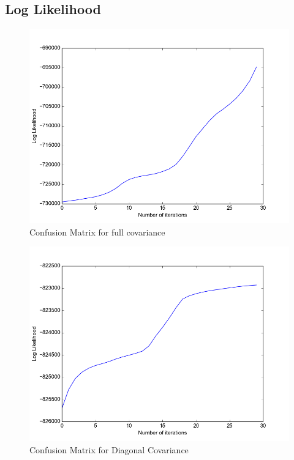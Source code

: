 \documentclass[11pt,a4paper]{article}
\begin{document}
\subsection{Log Likelihood}
\begin{minipage}[b]{0.5\textwidth}
\begin{figure}[H]
  \centering
  \includegraphics[width=.8\linewidth]{Figures/likelihood_digits0.png}
  \caption{Confusion Matrix for full covariance}
  \label{fig:sfig1}
\end{figure}%
\end{minipage}
\begin{minipage}[b]{0.5\textwidth}
\begin{figure}[H]
  \centering
  \includegraphics[width=.8\linewidth]{Figures/likelihood_digits1.png}
\caption{Confusion Matrix for Diagonal Covariance}
  \label{fig:sfig1}
\end{figure}%
\end{minipage}
\end{document}
